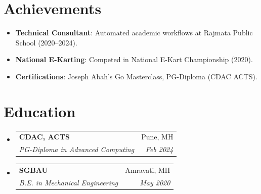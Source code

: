 \documentclass[letterpaper,11pt]{article}
\makeatletter
\newcommand{\resumeSubheading}[4]{
  \vspace{-1pt}\item
    \begin{tabular*}{0.97\textwidth}[t]{l@{\extracolsep{\fill}}r}
      \textbf{#1} & #2 \\
      \textit{\small#3} & \textit{\small #4} \\
    \end{tabular*}\vspace{-7pt}
}
\makeatother
\begin{document}
\section{Achievements}
\begin{itemize}[leftmargin=0.15in, label={}, nosep]
    \item \small{\textbf{Technical Consultant}: Automated academic workflows at Rajmata Public School (2020--2024).}
    \item \small{\textbf{National E-Karting}: Competed in National E-Kart Championship (2020).}
    \item \small{\textbf{Certifications}: Joseph Abah's Go Masterclass, PG-Diploma (CDAC ACTS).}
\end{itemize}

\section{Education}
\begin{itemize}[leftmargin=0.15in, label={}]
    \resumeSubheading
      {CDAC, ACTS}{Pune, MH}
      {PG-Diploma in Advanced Computing}{Feb 2024}
    \resumeSubheading
      {SGBAU}{Amravati, MH}
      {B.E. in Mechanical Engineering}{May 2020}
\end{itemize}
\end{document}
